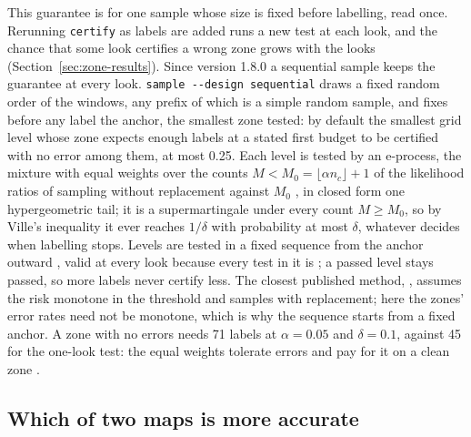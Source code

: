 \documentclass[11pt,a4paper]{article}
\newcommand{\code}[1]{\texttt{#1}}
\begin{document}
This guarantee is for one sample whose size is fixed before labelling, read once. Rerunning \code{certify} as labels
are added runs a new test at each look, and the chance that some look certifies a wrong zone grows with the looks
(Section~\ref{sec:zone-results}). Since version 1.8.0 a sequential sample keeps the guarantee at every look.
\code{sample -{}-design sequential} draws a fixed random order of the windows, any prefix of which is a simple random
sample, and fixes before any label the anchor, the smallest zone tested: by default the smallest grid level whose zone
expects enough labels at a stated first budget to be certified with no error among them, at most 0.25. Each level is
tested by an e-process, the mixture with equal weights over the counts $M < M_0 = \lfloor \alpha n_c \rfloor + 1$ of
the likelihood ratios of sampling without replacement against $M_0$ \citep{robbins1970}, in closed form one
hypergeometric tail; it is a supermartingale under every count $M \geq M_0$, so by Ville's inequality \citep{ville1939}
it ever reaches $1/\delta$ with probability at most $\delta$, whatever decides when labelling stops. Levels are tested
in a fixed sequence from the anchor outward \citep{bauer1991}, valid at every look because every test in it is
\citep{tamhane2010}; a passed level stays passed, so more labels never certify less. The closest published method,
\citet{xu2024}, assumes the risk monotone in the threshold and samples with replacement; here the zones' error rates
need not be monotone, which is why the sequence starts from a fixed anchor. A zone with no errors needs 71 labels at
$\alpha = 0.05$ and $\delta = 0.1$, against 45 for the one-look test: the equal weights tolerate errors and pay for it on
a clean zone \citep{waudbysmith2020,stark2023alpha}.

\subsection{Which of two maps is more accurate}
\label{sec:whichmap}
\end{document}
